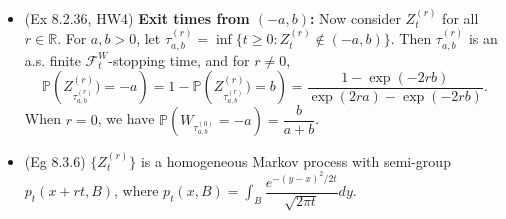 \documentclass[twoside]{article}
\newcommand{\dis}{\displaystyle}
\newcommand\bbP{\mathbb{P}}
\newcommand\bbR{\mathbb{R}}
\newcommand\calF{\mathcal{F}}
\begin{document}
\begin{itemize}
\item (Ex 8.2.36, HW4) \textbf{Exit times from $(-a,b)$:} Now consider $Z_t^{(r)}$ for all $r \in \bbR$. For $a,b > 0$, let $\tau_{a,b}^{(r)} = \inf \{t \geq 0: Z_t^{(r)} \notin (-a, b) \}$. Then $\tau_{a,b}^{(r)}$ is an a.s. finite $\calF_t^W$-stopping time, and for $r \neq 0$,
\[ \bbP \left(Z_{\tau_{a,b}^{(r)}}^{(r)}) = -a \right) = 1 - \bbP \left(Z_{\tau_{a,b}^{(r)}}^{(r)}) = b \right) = \frac{1 - \exp(-2rb)}{\exp(2ra) - \exp(-2rb)}. \]
When $r = 0$, we have $\bbP \left(W_{\tau_{a,b}^{(0)}} = -a \right) = \dfrac{b}{a+b}$.

\item (Eg 8.3.6) $\{Z_t^{(r)}\}$ is a homogeneous Markov process with semi-group $p_t(x+rt, B)$, where $p_t(x, B) = \dis\int_B \dfrac{e^{-(y-x)^2/2t}}{\sqrt{2\pi t}} dy$.



\end{itemize}
\end{document}
